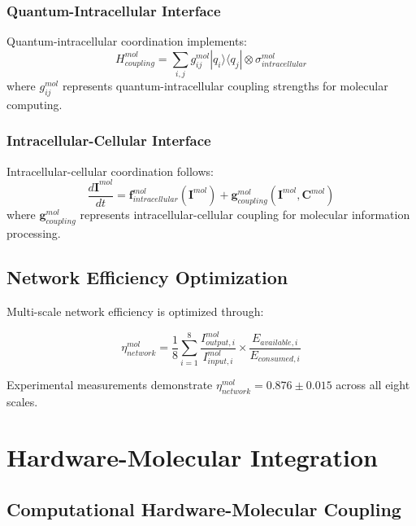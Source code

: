 \documentclass[12pt,a4paper]{article}
\begin{document}
\subsubsection{Quantum-Intracellular Interface}

Quantum-intracellular coordination implements:
\begin{equation}
H_{coupling}^{mol} = \sum_{i,j} g_{ij}^{mol} |q_i\rangle\langle q_j| \otimes \sigma_{intracellular}^{mol}
\end{equation}
where $g_{ij}^{mol}$ represents quantum-intracellular coupling strengths for molecular computing.

\subsubsection{Intracellular-Cellular Interface}

Intracellular-cellular coordination follows:
\begin{equation}
\frac{d\mathbf{I}^{mol}}{dt} = \mathbf{f}_{intracellular}^{mol}(\mathbf{I}^{mol}) + \mathbf{g}_{coupling}^{mol}(\mathbf{I}^{mol}, \mathbf{C}^{mol})
\end{equation}
where $\mathbf{g}_{coupling}^{mol}$ represents intracellular-cellular coupling for molecular information processing.

\subsection{Network Efficiency Optimization}

Multi-scale network efficiency is optimized through:

\begin{equation}
\eta_{network}^{mol} = \frac{1}{8} \sum_{i=1}^{8} \frac{I_{output,i}^{mol}}{I_{input,i}^{mol}} \times \frac{E_{available,i}}{E_{consumed,i}}
\end{equation}

Experimental measurements demonstrate $\eta_{network}^{mol} = 0.876 \pm 0.015$ across all eight scales.

\section{Hardware-Molecular Integration}

\subsection{Computational Hardware-Molecular Coupling}
\end{document}
